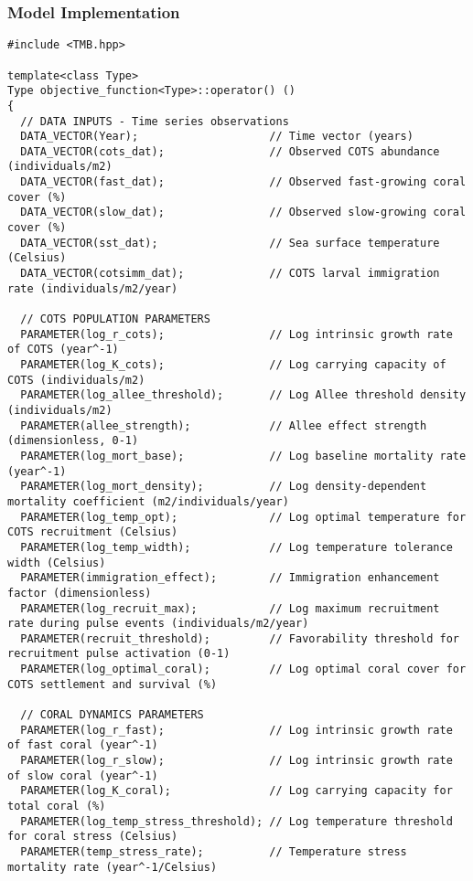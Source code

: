 \subsubsection{Model Implementation}
\begin{lstlisting}
#include <TMB.hpp>

template<class Type>
Type objective_function<Type>::operator() ()
{
  // DATA INPUTS - Time series observations
  DATA_VECTOR(Year);                    // Time vector (years)
  DATA_VECTOR(cots_dat);                // Observed COTS abundance (individuals/m2)
  DATA_VECTOR(fast_dat);                // Observed fast-growing coral cover (%)
  DATA_VECTOR(slow_dat);                // Observed slow-growing coral cover (%)
  DATA_VECTOR(sst_dat);                 // Sea surface temperature (Celsius)
  DATA_VECTOR(cotsimm_dat);             // COTS larval immigration rate (individuals/m2/year)
  
  // COTS POPULATION PARAMETERS
  PARAMETER(log_r_cots);                // Log intrinsic growth rate of COTS (year^-1)
  PARAMETER(log_K_cots);                // Log carrying capacity of COTS (individuals/m2)
  PARAMETER(log_allee_threshold);       // Log Allee threshold density (individuals/m2)
  PARAMETER(allee_strength);            // Allee effect strength (dimensionless, 0-1)
  PARAMETER(log_mort_base);             // Log baseline mortality rate (year^-1)
  PARAMETER(log_mort_density);          // Log density-dependent mortality coefficient (m2/individuals/year)
  PARAMETER(log_temp_opt);              // Log optimal temperature for COTS recruitment (Celsius)
  PARAMETER(log_temp_width);            // Log temperature tolerance width (Celsius)
  PARAMETER(immigration_effect);        // Immigration enhancement factor (dimensionless)
  PARAMETER(log_recruit_max);           // Log maximum recruitment rate during pulse events (individuals/m2/year)
  PARAMETER(recruit_threshold);         // Favorability threshold for recruitment pulse activation (0-1)
  PARAMETER(log_optimal_coral);         // Log optimal coral cover for COTS settlement and survival (%)
  
  // CORAL DYNAMICS PARAMETERS
  PARAMETER(log_r_fast);                // Log intrinsic growth rate of fast coral (year^-1)
  PARAMETER(log_r_slow);                // Log intrinsic growth rate of slow coral (year^-1)
  PARAMETER(log_K_coral);               // Log carrying capacity for total coral (%)
  PARAMETER(log_temp_stress_threshold); // Log temperature threshold for coral stress (Celsius)
  PARAMETER(temp_stress_rate);          // Temperature stress mortality rate (year^-1/Celsius)
  

\end{lstlisting}
